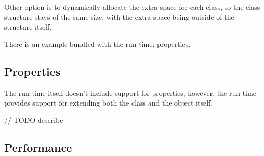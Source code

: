 Other option is to dynamically allocate the extra space for each class, so the class structure stays of the same size, with the extra space being outside of the structure itself.


There is an example bundled with the run-time: properties.

\subsection{Properties}

The run-time itself doesn't include support for properties, however, the run-time provides support for extending both the class and the object itself.

// TODO describe


\subsection{Performance}